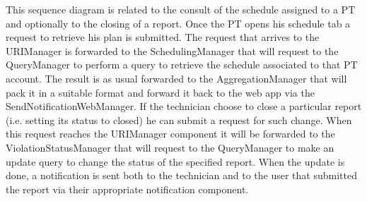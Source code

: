 This sequence diagram is related to the consult of the schedule assigned to a PT and optionally to the closing of a report. Once the PT opens his schedule tab a request to retrieve his plan is submitted. The request that arrives to the URIManager is forwarded to the SchedulingManager that will request to the QueryManager to perform a query to retrieve the schedule associated to that PT account. The result is as usual forwarded to the AggregationManager that will pack it in a suitable format and forward it back to the web app via the SendNotificationWebManager. If the technician choose to close a particular report (i.e. setting its status to closed) he can submit a request for such change. When this request reaches the URIManager component it will be forwarded to the ViolationStatusManager that will request to the QueryManager to make an update query to change the status of the specified report. When the update is done, a notification is sent both to the technician and to the user that submitted the report via their appropriate notification component. 
